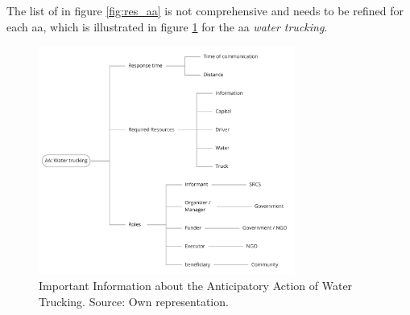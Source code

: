 The list of in figure \ref{fig:res_aa} is not comprehensive and needs to be refined for each \acrshort{aa}, which is illustrated in figure \ref{fig:res_water_truck} for the \acrshort{aa} \textit{water trucking}.

\begin{figure}[!h]
    \centering
    \includegraphics[width=0.75\textwidth]{figures/2023_MA_results_trucking.pdf}
    \decoRule
    \caption[Water Trucking Parameters]{Important Information about the Anticipatory Action of Water Trucking. Source: Own representation.}
    \label{fig:res_water_truck}
\end{figure}

